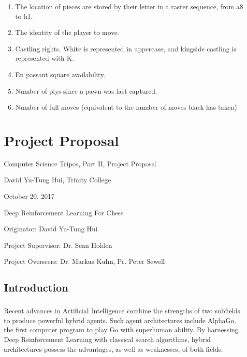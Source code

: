 \documentclass[12pt,a4paper]{book}
\begin{document}
\begin{enumerate}
\item The location of pieces are stored by their letter in a raster sequence, from a8 to h1.
\item The identity of the player to move.
\item Castling rights. White is represented in uppercase, and kingside castling is represented with K.
\item En passant square availability.
\item Number of plys since a pawn was last captured.
\item Number of full moves (equivalent to the number of moves black has taken)
\end{enumerate}
  
\chapter{Project Proposal}
\newpage
\centerline{}
\vspace{1in}
\centerline{\LARGE Computer Science Tripos, Part II, Project Proposal}
\vspace{0.2in}
\centerline{\large David Yu-Tung Hui, Trinity College}
\vspace{0.15in}
\centerline{\large October 20, 2017}
\vspace{0.3in}

\centerline{\huge Deep Reinforcement Learning For Chess}
\vspace{0.2in}
\centerline{\large Originator: David Yu-Tung Hui}
\vspace{0.05in}
\centerline{\large Project Supervisor: Dr. Sean Holden}
\vspace{0.05in}
\centerline{\large Project Overseers: Dr. Markus Kuhn, Pr. Peter Sewell}

\section*{Introduction}

\paragraph{}Recent advances in Artificial Intelligence combine the strengths of two subfields to produce powerful hybrid agents. Such agent architectures include AlphaGo, the first computer program to play Go with superhuman ability. \cite{AlphaGo} By harnessing Deep Reinforcement Learning with classical search algorithms, hybrid architectures possess the advantages, as well as weaknesses, of both fields.
\end{document}
